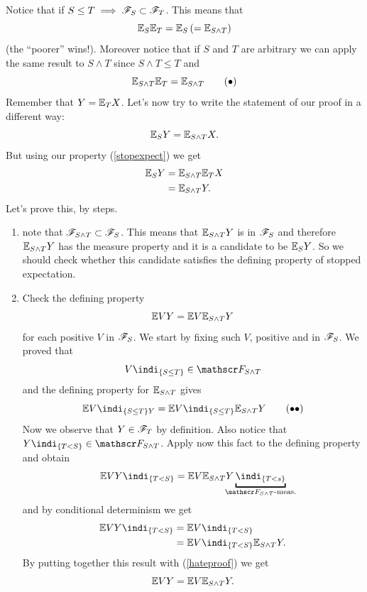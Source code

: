\documentclass{report}
\begin{document}
\begin{fancyproof}
	Notice that if $S\leq T\implies\mathscr{F}_S\subset\mathscr{F}_T$. This means that 
	\[\mathbb{E}_S\mathbb{E}_T=\mathbb{E}_S\left(=\mathbb{E}_{S\wedge T}\right)\]
	(the ``poorer'' \sa{} wins!). Moreover notice that if $S$ and $T$ are arbitrary we can apply the same result to $S\wedge T$ since $S\wedge T\leq T$ and 
	\begin{equation}
		\mathbb{E}_{S\wedge T}\mathbb{E}_{T}=\mathbb{E}_{S\wedge T}\tag{$\bullet$}\label{stopexpect}
	\end{equation}
	Remember that $Y=\mathbb{E}_T X$. Let's now try to write the statement of our proof in a different way:
	\[\mathbb{E}_S Y=\mathbb{E}_{S\wedge T}X.\]
	But using our property (\ref{stopexpect}) we get
	\begin{align*}
		\mathbb{E}_S Y&=\mathbb{E}_{S\wedge T}\mathbb{E}_T X\\
		&=\mathbb{E}_{S\wedge T} Y.
	\end{align*}
	Let's prove this, by steps.
	\begin{enumerate}
		\item note that $\mathscr{F}_{S\wedge T}\subset\mathscr{F}_S$. This means that $\mathbb{E}_{S\wedge T}Y$ is in $\mathscr{F}_S$ and therefore $\mathbb{E}_{S\wedge T}Y $ has the measure property and it is a candidate to be $\mathbb{E}_S Y$. So we should check whether this candidate satisfies the defining property of stopped expectation.
			\item Check the defining property
			\[\mathbb{E} VY=\mathbb{E} V\mathbb{E}_{S\wedge T}Y\]
			for each positive $V$ in $\mathscr{F}_S$. We start by fixing such $V$, positive and in $\mathscr{F}_S$. We proved that 
			\[V\indi_{\{S\leq T\}}\in\F_{S\wedge T}\]
			and the defining property for $\mathbb{E}_{S\wedge T}$ gives
			\begin{equation}
				\ev V\indi_{\{S\leq T\}Y}=\ev V\indi_{\{S\leq T\}}\ev_{S\wedge T}Y\tag{$\bullet\bullet$}\label{hateproof}
			\end{equation}
			Now we observe that $Y\in\mathscr{F}_T$ by definition. Also notice that $Y\indi_{\{T<S\}}\in\F_{S\wedge T}$. Apply now this fact to the defining property and obtain
			\begin{equation*}
				\ev VY\indi_{\{T<S\}}=\ev V\ev_{S\wedge T}Y\underbracket{\indi_{\{T<s\}}}_{\mathclap{\F_{S\wedge T}\text{-meas.}}}
			\end{equation*}
			and by conditional determinism we get
			\begin{align*}
				\ev VY\indi_{\{T<S\}}&=\ev V\indi_{\{T<S\}}\\
				&=\ev V\indi_{\{T<S\}}\ev_{S\wedge T}Y.
			\end{align*}
			By putting together this result with (\ref{hateproof}) we get
			\begin{equation*}
				\mathbb{E} V Y=\mathbb{E} V\mathbb{E}_{S\wedge T}Y.
			\end{equation*}
	\end{enumerate}
\end{fancyproof}
\end{document}
